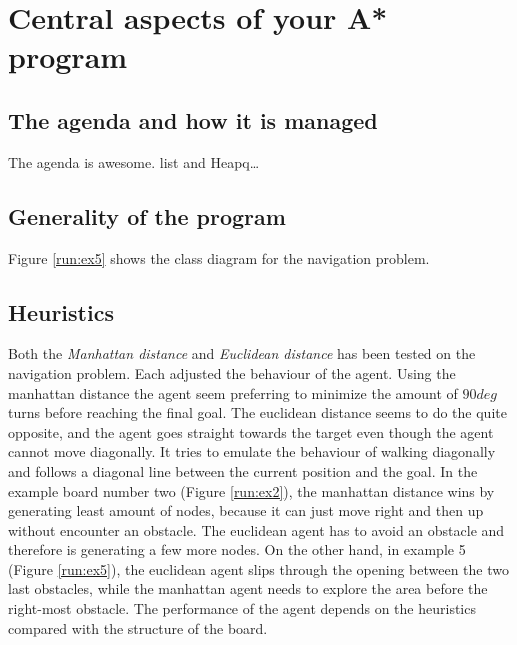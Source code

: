 \section{Central aspects of your A* program}
\subsection{The agenda and how it is managed}
The agenda is awesome. list and Heapq\ldots

\subsection{Generality of the program}



Figure \ref{run:ex5} shows the class diagram for the navigation problem.



\subsection{Heuristics}
Both the \emph{Manhattan distance} and \emph{Euclidean distance} has been tested on the navigation problem. Each adjusted the behaviour of the agent. Using the manhattan distance the agent seem preferring to minimize the amount of \(90 deg\) turns before reaching the final goal. The euclidean distance seems to do the quite opposite, and the agent goes straight towards the target even though the agent cannot move diagonally. It tries to emulate the behaviour of walking diagonally and follows a diagonal line between the current position and the goal. In the example board number two (Figure \ref{run:ex2}), the manhattan distance wins by generating least amount of nodes, because it can just move right and then up without encounter an obstacle. The euclidean agent has to avoid an obstacle and therefore is generating a few more nodes. On the other hand, in example 5 (Figure \ref{run:ex5}), the euclidean agent slips through the opening between the two last obstacles, while the manhattan agent needs to explore the area before the right-most obstacle. The performance of the agent depends on the heuristics compared with the structure of the board.

